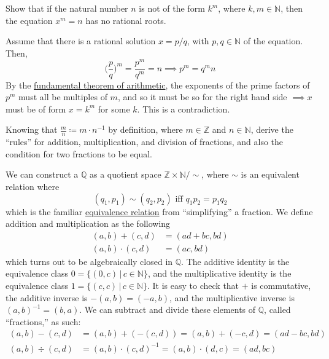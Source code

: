   \begin{exercise}[Zorich 2.2.9]
    Show that if the natural number $n$ is not of the form $k^m$, where $k, m \in \mathbb{N}$, then the equation $x^m = n$ has no rational roots. 
  \end{exercise}
  \begin{solution}
    Assume that there is a rational solution $x = p/q$, with $p, q \in \mathbb{N}$ of the equation. Then, 
    \begin{equation}
      \bigg( \frac{p}{q}\bigg)^m = \frac{p^m}{q^m} = n \implies p^m = q^m n
    \end{equation}
    By the \hyperref[alg-thm:fundamental-theorem-of-arithmetic]{fundamental theorem of arithmetic}, the exponents of the prime factors of $p^m$ must all be multiples of $m$, and so it must be so for the right hand side $\implies x$ must be of form $x = k^m$ for some $k$. This is a contradiction. 
  \end{solution}

  \begin{exercise}[Zorich 2.2.12]
    Knowing that $\frac{m}{n} \coloneqq m \cdot n^{-1}$ by definition, where $m \in \mathbb{Z}$ and $n \in \mathbb{N}$, derive the ``rules'' for addition, multiplication, and division of fractions, and also the condition for two fractions to be equal. 
  \end{exercise}
  \begin{solution}
    We can construct a $\mathbb{Q}$ as a quotient space $\mathbb{Z} \times \mathbb{N} / \sim$, where $\sim$ is an equivalent relation where 
    \begin{equation}
      (q_1, p_1) \sim (q_2 , p_2) \text{ iff } q_1 p_2 = p_1 q_2
    \end{equation}
    which is the familiar \hyperref[st-def:equivalence_relation]{equivalence relation} from ``simplifying'' a fraction. We define addition and multiplication as the following 
    \begin{align*}
      (a, b) + (c, d) & = (ad + bc, bd) \\
      (a, b) \cdot (c, d) & = (ac, bd) 
    \end{align*}
    which turns out to be algebraically closed in $\mathbb{Q}$. The additive identity is the equivalence class $0 = \{(0, c) \,|\, c \in \mathbb{N}\}$, and the multiplicative identity is the equivalence class $1 = \{(c, c) \,|\, c \in \mathbb{N}\}$. It is easy to check that $+$ is commutative, the additive inverse is $-(a, b) = (-a, b)$, and the multiplicative inverse is $(a, b)^{-1} = (b, a)$. We can subtract and divide these elements of $\mathbb{Q}$, called ``fractions,'' as such: 
    \begin{align*}
      (a, b) - (c, d) & = (a, b) + (-(c, d)) = (a, b) + (-c, d) = (ad - bc, bd) \\
      (a, b) \div (c, d) & = (a, b) \cdot (c, d)^{-1} = (a, b) \cdot (d, c) = (ad, bc) 
    \end{align*}
  \end{solution}

